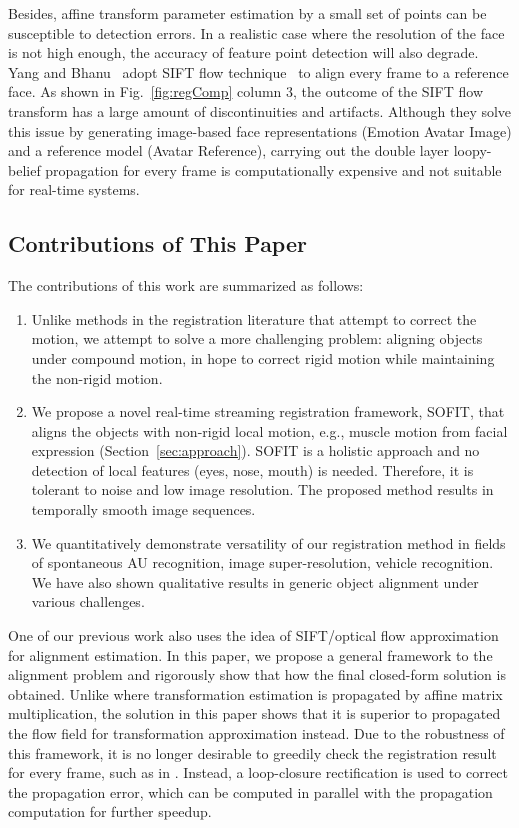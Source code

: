 \documentclass[10pt,journal]{IEEEtran}
\begin{document}
Besides, affine transform parameter estimation by a small set of points can be susceptible to detection errors. In a realistic case where the resolution of the face is not high enough, the accuracy of feature point detection will also degrade. Yang and Bhanu~\cite{Yang_SMCB12} adopt SIFT flow technique~\cite{Liu_PAMI11} to align every frame to a reference face. As shown in Fig.~\ref{fig:regComp} column 3, the outcome of the SIFT flow transform has a large amount of discontinuities and artifacts. Although they solve this issue by generating image-based face representations (Emotion Avatar Image) and a reference model (Avatar Reference), carrying out the double layer loopy-belief propagation for every frame is computationally expensive and not suitable for real-time systems.

\subsection{\label{sec:contribution}Contributions of This Paper}

The contributions of this work are summarized as follows:

\begin{enumerate}
\item \textcolor[rgb]{1,0,0}{Unlike methods in the registration literature that attempt to correct the motion, we attempt to solve a more challenging problem: aligning objects under compound motion, in hope to correct rigid motion while maintaining the non-rigid motion. }
\item We propose a novel real-time streaming registration framework, SOFIT, that aligns the objects with non-rigid local motion, e.g., muscle motion from facial expression (Section~\ref{sec:approach}). SOFIT is a holistic approach and no detection of local features (eyes, nose, mouth) is needed. Therefore, it is tolerant to noise and low image resolution. The proposed method results in temporally smooth image sequences.
\item We quantitatively demonstrate versatility of our registration method in fields of spontaneous AU recognition, image super-resolution, vehicle recognition. \textcolor[rgb]{1,0,0}{We have also shown qualitative results in generic object alignment under various challenges}.
\end{enumerate}

One of our previous work \cite{Yang_FG13} also uses the idea of SIFT/optical flow approximation for alignment estimation. In this paper, we propose a general framework to the alignment problem and rigorously show that how the final closed-form solution is obtained. Unlike \cite{Yang_FG13} where transformation estimation is propagated by affine matrix multiplication, the solution in this paper shows that it is superior to propagated the flow field for transformation approximation instead. Due to the robustness of this framework, it is no longer desirable to greedily check the registration result for every frame, such as in \cite{Yang_FG13}. Instead, a loop-closure rectification is used to correct the propagation error, which can be computed in parallel with the propagation computation for further speedup. 
\end{document}
